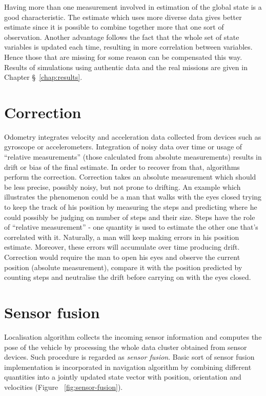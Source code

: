 Having more than one measurement involved in estimation of the global state is a good characteristic. The estimate which uses more diverse data gives better estimate since it is possible to combine together more that one sort of observation. Another advantage follows the fact that the whole set of state variables is updated each time, resulting in more correlation between variables. Hence those that are missing for some reason can be compensated this way. Results of simulations using authentic data and the  real missions are given in Chapter \S~\ref{chap:results}. 
\section{Correction}
Odometry integrates velocity and acceleration data collected from devices such as gyroscope or accelerometers. Integration of noisy data over time or usage of ``relative measurements'' (those calculated from absolute measurements) results in drift or bias of the final estimate. In order to recover from that, algorithms perform the correction. Correction takes an absolute measurement which should be less precise, possibly noisy, but not prone to drifting. An example which illustrates the phenomenon could be a man that walks with the eyes closed trying to keep the track of his position by measuring the steps and predicting where he could possibly be judging on number of steps and their size. Steps have the role of ``relative measurement'' - one quantity is used to estimate the other one that's correlated with it. Naturally, a man will keep making errors in his position estimate. Moreover, these errors will accumulate over time producing drift. Correction would require the man to open his eyes and observe the current position (absolute measurement), compare it with the position predicted by counting steps and neutralise the drift before carrying on with the eyes closed. 
\section{Sensor fusion}
Localisation algorithm collects the incoming sensor information and computes the pose of the vehicle by processing the whole data cluster obtained from sensor devices. Such procedure is regarded as \textit{sensor fusion}. Basic sort of sensor fusion implementation is incorporated in navigation algorithm by combining different quantities into a jointly updated state vector with position, orientation and velocities (Figure ~\ref{fig:sensor-fusion}).
